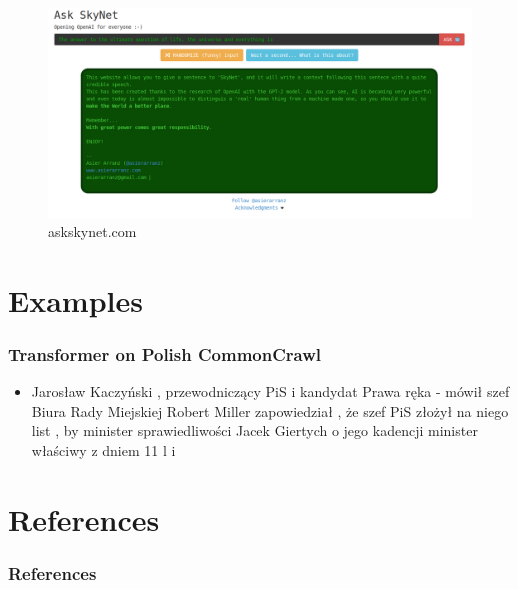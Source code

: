 \documentclass{beamer}
\begin{document}
\begin{frame}
    \begin{center}
    \begin{figure}
        \includegraphics[scale=1.1]{img/ask_skynet.png}
    	\caption{askskynet.com}
    \end{figure}
    \end{center}
\end{frame}


\section{Examples}

\begin{frame}
    \frametitle{Transformer on Polish CommonCrawl}
	\begin{itemize}
		\item[] Jarosław Kaczyński , przewodniczący PiS i kandydat Prawa ręka - mówił szef Biura Rady Miejskiej Robert Miller zapowiedział , że szef PiS złożył na niego list , by minister sprawiedliwości Jacek Giertych o jego kadencji minister właściwy z dniem 11 l i
	\end{itemize}
\end{frame}


\section{References}
\begin{frame}[allowframebreaks,t]
    \tiny
    \frametitle{References}
    
    
\end{frame}
\end{document}
